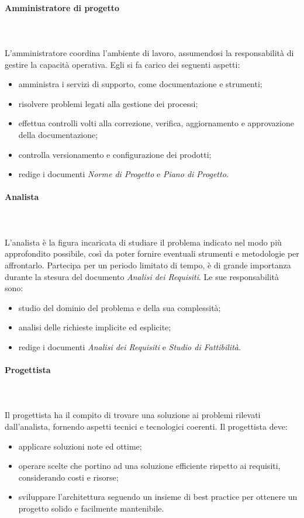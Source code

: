 			\paragraph{Amministratore di progetto} \mbox{}\\ \mbox{}\\
			L'amministratore coordina l'ambiente di lavoro, assumendosi la responsabilità di gestire la capacità operativa.\newline
			Egli si fa carico dei seguenti aspetti:
			\begin{itemize}
				\item amministra i servizi di supporto, come documentazione e strumenti;
				\item risolvere problemi legati alla gestione dei processi;
				\item effettua controlli volti alla correzione, verifica, aggiornamento e approvazione della documentazione;
				\item controlla versionamento e configurazione dei prodotti;
				\item redige i documenti \textit{Norme di Progetto} e \textit{Piano di Progetto}.
			\end{itemize}
			\paragraph{Analista} \mbox{}\\ \mbox{}\\
			L'analista è la figura incaricata di studiare il problema indicato nel modo più approfondito possibile, così da poter fornire eventuali strumenti e metodologie per affrontarlo. 
			Partecipa per un periodo limitato di tempo, è di grande importanza durante la stesura del documento \textit{Analisi dei Requisiti}.\newline
			Le sue responsabilità sono:
			\begin{itemize}
				\item studio del dominio del problema e della sua complessità;
				\item analisi delle richieste implicite ed esplicite;
				\item redige i documenti \textit{Analisi dei Requisiti} e \textit{Studio di Fattibilità}.
			\end{itemize}
			\paragraph{Progettista} \mbox{}\\ \mbox{}\\
			Il progettista ha il compito di trovare una soluzione ai problemi rilevati dall'analista, fornendo aspetti tecnici e tecnologici coerenti.\newline
			Il progettista deve:
			\begin{itemize}
				\item applicare soluzioni note ed ottime;
				\item operare scelte che portino ad una soluzione efficiente rispetto ai requisiti, considerando costi e risorse;
				\item sviluppare l'architettura seguendo un insieme di best practice per ottenere un progetto solido e facilmente mantenibile.
			\end{itemize}
